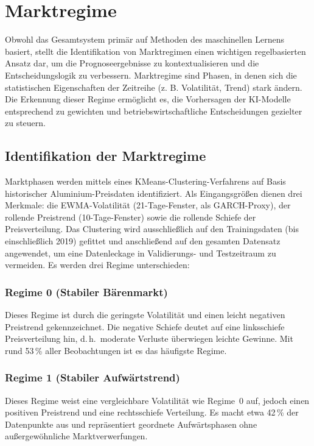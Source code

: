 \section{Marktregime}
Obwohl das Gesamtsystem primär auf Methoden des maschinellen Lernens basiert, stellt die Identifikation von Marktregimen einen wichtigen regelbasierten Ansatz dar, um die Prognoseergebnisse zu kontextualisieren und die Entscheidungslogik zu verbessern.
Marktregime sind Phasen, in denen sich die statistischen Eigenschaften der Zeitreihe (z. B. Volatilität, Trend) stark ändern.
Die Erkennung dieser Regime ermöglicht es, die Vorhersagen der KI-Modelle entsprechend zu gewichten und betriebswirtschaftliche Entscheidungen gezielter zu steuern.

\subsection{Identifikation der Marktregime}
Marktphasen werden mittels eines KMeans-Clustering-Verfahrens auf Basis historischer Aluminium-Preisdaten identifiziert.
Als Eingangsgrößen dienen drei Merkmale: die EWMA-Volatilität (21-Tage-Fenster, als GARCH-Proxy), der rollende Preistrend (10-Tage-Fenster) sowie die rollende Schiefe der Preisverteilung.
Das Clustering wird ausschließlich auf den Trainingsdaten (bis einschließlich 2019) gefittet und anschließend auf den gesamten Datensatz angewendet, um eine Datenleckage in Validierungs- und Testzeitraum zu vermeiden.
Es werden drei Regime unterschieden:

\subsubsection{Regime 0 (Stabiler Bärenmarkt)}
Dieses Regime ist durch die geringste Volatilität und einen leicht negativen Preistrend gekennzeichnet.
Die negative Schiefe deutet auf eine linksschiefe Preisverteilung hin, d.\,h.\ moderate Verluste überwiegen leichte Gewinne.
Mit rund 53\,\% aller Beobachtungen ist es das häufigste Regime.

\subsubsection{Regime 1 (Stabiler Aufwärtstrend)}
Dieses Regime weist eine vergleichbare Volatilität wie Regime~0 auf, jedoch einen positiven Preistrend und eine rechtsschiefe Verteilung.
Es macht etwa 42\,\% der Datenpunkte aus und repräsentiert geordnete Aufwärtsphasen ohne außergewöhnliche Marktverwerfungen.

